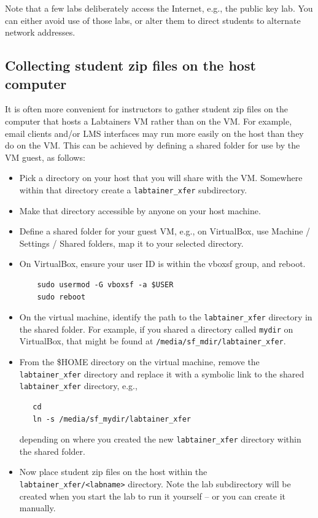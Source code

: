\documentclass[12pt]{article}
\begin{document}
Note that a few labs deliberately access the Internet, e.g., the public key lab.  You can either avoid use
of those labs, or alter them to direct students to alternate network addresses.

\subsection{Collecting student zip files on the host computer}
\label{shared_labtainer_xfer}
It is often more convenient for instructors to gather student zip files on the computer that hosts a Labtainers
VM rather than on the VM.  For example, email clients and/or LMS interfaces may run more easily on the host than
they do on the VM.  This can be achieved by defining a shared folder for use by the VM guest, as follows:
\begin{itemize}
\item Pick a directory on your host that you will share with the VM. Somewhere within that directory create a
{\tt labtainer\_xfer} subdirectory.
\item Make that directory accessible by anyone on your host machine.  
\item Define a shared folder for your guest VM, e.g., on VirtualBox, use Machine / Settings / Shared folders, map it
to your selected directory.  
\item On VirtualBox, ensure your user ID is within the vboxsf group, and reboot.
\begin{verbatim}
    sudo usermod -G vboxsf -a $USER
    sudo reboot
\end{verbatim}
\item On the virtual machine, identify the path to the {\tt labtainer\_xfer} directory in the shared folder.  For example,
if you shared a directory called {\tt mydir} on VirtualBox, that might be found at {\tt /media/sf\_mdir/labtainer\_xfer}.
\item From the \$HOME directory on the virtual machine, remove the {\tt labtainer\_xfer} directory and replace it with
a symbolic link to the shared {\tt labtainer\_xfer} directory, e.g.,
\begin{verbatim}
   cd 
   ln -s /media/sf_mydir/labtainer_xfer
\end{verbatim}
\noindent depending on where you created the new {\tt labtainer\_xfer} directory within the shared folder.
\item Now place student zip files on the host within the {\tt labtainer\_xfer/<labname>} directory.  Note
the lab subdirectory will be created when you start the lab to run it yourself -- or you can create it manually.
\end{itemize}
\end{document}
